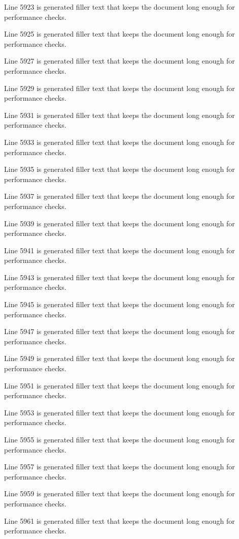 Line 5923 is generated filler text that keeps the document long enough for performance checks.

Line 5925 is generated filler text that keeps the document long enough for performance checks.

Line 5927 is generated filler text that keeps the document long enough for performance checks.

Line 5929 is generated filler text that keeps the document long enough for performance checks.

Line 5931 is generated filler text that keeps the document long enough for performance checks.

Line 5933 is generated filler text that keeps the document long enough for performance checks.

Line 5935 is generated filler text that keeps the document long enough for performance checks.

Line 5937 is generated filler text that keeps the document long enough for performance checks.

Line 5939 is generated filler text that keeps the document long enough for performance checks.

Line 5941 is generated filler text that keeps the document long enough for performance checks.

Line 5943 is generated filler text that keeps the document long enough for performance checks.

Line 5945 is generated filler text that keeps the document long enough for performance checks.

Line 5947 is generated filler text that keeps the document long enough for performance checks.

Line 5949 is generated filler text that keeps the document long enough for performance checks.

Line 5951 is generated filler text that keeps the document long enough for performance checks.

Line 5953 is generated filler text that keeps the document long enough for performance checks.

Line 5955 is generated filler text that keeps the document long enough for performance checks.

Line 5957 is generated filler text that keeps the document long enough for performance checks.

Line 5959 is generated filler text that keeps the document long enough for performance checks.

Line 5961 is generated filler text that keeps the document long enough for performance checks.

